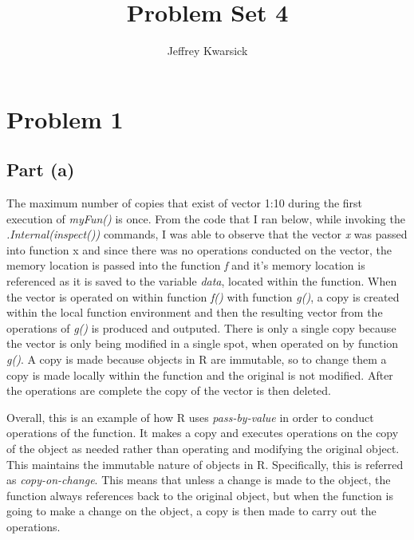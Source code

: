\documentclass{article}\usepackage[]{graphicx}\usepackage[]{color}
\begin{document}
\title{Problem Set 4}
\author{Jeffrey Kwarsick}
\maketitle
\section{Problem 1}
\subsection{Part (a)}
The maximum number of copies that exist of vector 1:10 during the first execution of \emph{myFun()} is once.  From the code that I ran below, while invoking the \emph{.Internal(inspect())} commands, I was able to observe that the vector \emph{x} was passed into function x and since there was no operations conducted on the vector, the memory location is passed into the function \emph{f} and it's memory location is referenced as it is saved to the variable \emph{data}, located within the function.  When the vector is operated on within function \emph{f()} with function \emph{g()}, a copy is created within the local function environment and then the resulting vector from the operations of \emph{g()} is produced and outputed.  There is only a single copy because the vector is only being modified in a single spot, when operated on by function \emph{g()}.  A copy is made because objects in R are immutable, so to change them a copy is made locally within the function and the original is not modified.  After the operations are complete the copy of the vector is then deleted.
\par{Overall, this is an example of how R uses \emph{pass-by-value} in order to conduct operations of the function.  It makes a copy and executes operations on the copy of the object as needed rather than operating and modifying the original object.  This maintains the immutable nature of objects in R.  Specifically, this is referred as \emph{copy-on-change}.  This means that unless a change is made to the object, the function always references back to the original object, but when the function is going to make a change on the object, a copy is then made to carry out the operations.}
\end{document}
